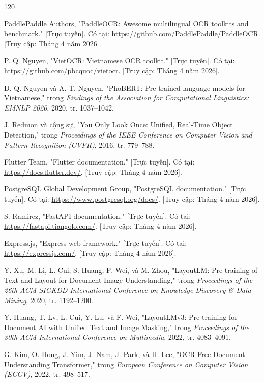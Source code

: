 \documentclass[12pt,a4paper]{report}
\begin{document}
\begingroup
\sloppy
\raggedright
{}
{}
\begin{thebibliography}{120}

PaddlePaddle Authors, "PaddleOCR: Awesome multilingual OCR toolkits and benchmark." [Trực tuyến]. Có tại: \url{https://github.com/PaddlePaddle/PaddleOCR}. [Truy cập: Tháng 4 năm 2026].

P. Q. Nguyen, "VietOCR: Vietnamese OCR toolkit." [Trực tuyến]. Có tại: \url{https://github.com/pbcquoc/vietocr}. [Truy cập: Tháng 4 năm 2026].

D. Q. Nguyen và A. T. Nguyen, "PhoBERT: Pre-trained language models for Vietnamese," trong \textit{Findings of the Association for Computational Linguistics: EMNLP 2020}, 2020, tr. 1037--1042.

J. Redmon và cộng sự, "You Only Look Once: Unified, Real-Time Object Detection," trong \textit{Proceedings of the IEEE Conference on Computer Vision and Pattern Recognition (CVPR)}, 2016, tr. 779--788.

Flutter Team, "Flutter documentation." [Trực tuyến]. Có tại: \url{https://docs.flutter.dev/}. [Truy cập: Tháng 4 năm 2026].

PostgreSQL Global Development Group, "PostgreSQL documentation." [Trực tuyến]. Có tại: \url{https://www.postgresql.org/docs/}. [Truy cập: Tháng 4 năm 2026].

S. Ramirez, "FastAPI documentation." [Trực tuyến]. Có tại: \url{https://fastapi.tiangolo.com/}. [Truy cập: Tháng 4 năm 2026].

Express.js, "Express web framework." [Trực tuyến]. Có tại: \url{https://expressjs.com/}. [Truy cập: Tháng 4 năm 2026].

Y. Xu, M. Li, L. Cui, S. Huang, F. Wei, và M. Zhou, "LayoutLM: Pre-training of Text and Layout for Document Image Understanding," trong \textit{Proceedings of the 26th ACM SIGKDD International Conference on Knowledge Discovery \& Data Mining}, 2020, tr. 1192--1200.

Y. Huang, T. Lv, L. Cui, Y. Lu, và F. Wei, "LayoutLMv3: Pre-training for Document AI with Unified Text and Image Masking," trong \textit{Proceedings of the 30th ACM International Conference on Multimedia}, 2022, tr. 4083--4091.

G. Kim, O. Hong, J. Yim, J. Nam, J. Park, và H. Lee, "OCR-Free Document Understanding Transformer," trong \textit{European Conference on Computer Vision (ECCV)}, 2022, tr. 498--517.


\end{thebibliography}
\end{document}
